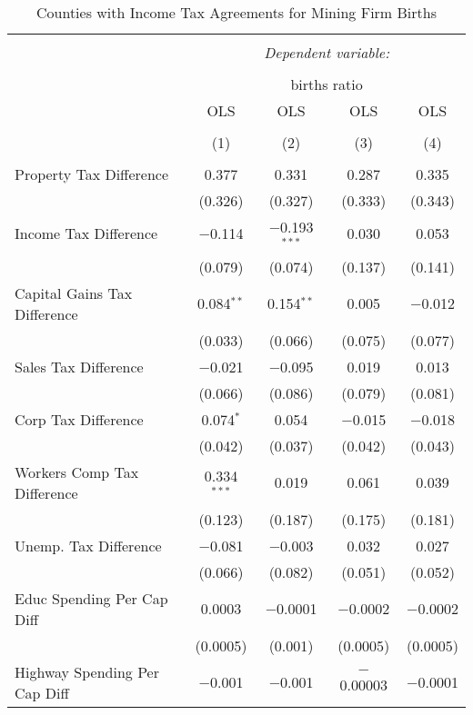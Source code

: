 
\begin{table}[!htbp] \centering 
  \caption{Counties with Income Tax Agreements for  Mining Firm Births} 
  \label{21rd} 
\begin{tabular}{@{\extracolsep{5pt}}lcccc} 
\\[-1.8ex]\hline 
\hline \\[-1.8ex] 
 & \multicolumn{4}{c}{\textit{Dependent variable:}} \\ 
\cline{2-5} 
\\[-1.8ex] & \multicolumn{4}{c}{births ratio} \\ 
 & OLS & OLS & OLS & OLS \\ 
\\[-1.8ex] & (1) & (2) & (3) & (4)\\ 
\hline \\[-1.8ex] 
 Property Tax Difference & 0.377 & 0.331 & 0.287 & 0.335 \\ 
  & (0.326) & (0.327) & (0.333) & (0.343) \\ 
  Income Tax Difference & $-$0.114 & $-$0.193$^{***}$ & 0.030 & 0.053 \\ 
  & (0.079) & (0.074) & (0.137) & (0.141) \\ 
  Capital Gains Tax Difference & 0.084$^{**}$ & 0.154$^{**}$ & 0.005 & $-$0.012 \\ 
  & (0.033) & (0.066) & (0.075) & (0.077) \\ 
  Sales Tax Difference & $-$0.021 & $-$0.095 & 0.019 & 0.013 \\ 
  & (0.066) & (0.086) & (0.079) & (0.081) \\ 
  Corp Tax Difference & 0.074$^{*}$ & 0.054 & $-$0.015 & $-$0.018 \\ 
  & (0.042) & (0.037) & (0.042) & (0.043) \\ 
  Workers Comp Tax Difference & 0.334$^{***}$ & 0.019 & 0.061 & 0.039 \\ 
  & (0.123) & (0.187) & (0.175) & (0.181) \\ 
  Unemp. Tax Difference & $-$0.081 & $-$0.003 & 0.032 & 0.027 \\ 
  & (0.066) & (0.082) & (0.051) & (0.052) \\ 
  Educ Spending Per Cap Diff & 0.0003 & $-$0.0001 & $-$0.0002 & $-$0.0002 \\ 
  & (0.0005) & (0.001) & (0.0005) & (0.0005) \\ 
  Highway Spending Per Cap Diff & $-$0.001 & $-$0.001 & $-$0.00003 & $-$0.0001 \\ 

\end{tabular}
\end{table}
